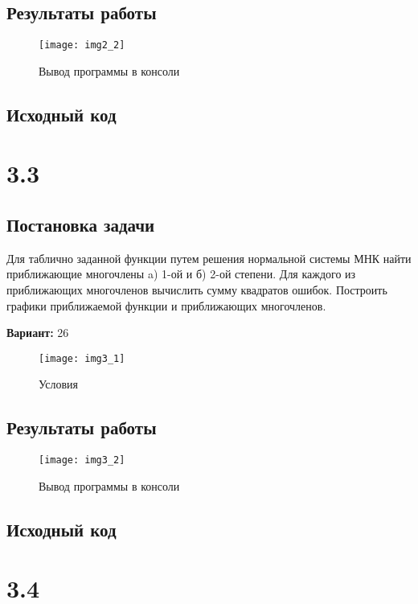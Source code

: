 \subsection{Результаты работы}
\begin{figure}[h!]
\centering
\texttt{[image: img2\_2]}
\caption{Вывод программы в консоли}
\end{figure}
\pagebreak

\subsection{Исходный код}


\pagebreak

\section* {3.3}

\subsection{Постановка задачи}
Для таблично заданной функции путем решения нормальной системы МНК найти приближающие многочлены a) 1-ой  и б) 2-ой степени. Для каждого из приближающих многочленов вычислить сумму квадратов ошибок. Построить графики приближаемой функции и приближающих многочленов.

{\bfseries Вариант:} 26
\begin{figure}[h!]
\centering
\texttt{[image: img3\_1]}
\caption{Условия}
\end{figure}

\subsection{Результаты работы}
\begin{figure}[h!]
\centering
\texttt{[image: img3\_2]}
\caption{Вывод программы в консоли}
\end{figure}
\pagebreak

\subsection{Исходный код}

\pagebreak

\section* {3.4}

